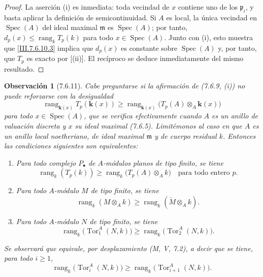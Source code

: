 \documentclass[10pt,oneside,openany]{book}
\theoremstyle{egaenv}\newtheorem*{env}{---}
\theoremstyle{egastatement}
\theoremstyle{egadescription}
\newtheorem*{remark}{Observación}
\renewcommand{\leq}{\leqslant}
\renewcommand{\geq}{\geqslant}
\begin{document}
\begin{proof}
La aserción \textnormal{(i)} es inmediata: toda vecindad de $x$
contiene uno de los $\mathfrak p_i$, y basta aplicar la definición de
semicontinuidad. Si $A$ es local, la única vecindad en $\operatorname{Spec}(A)$ del ideal
maximal $\mathfrak m$ es $\operatorname{Spec}(A)$; por tanto,
$d_p(x)\leq\operatorname{rang}_k T_p(k)$
para todo $x\in\operatorname{Spec}(A)$. Junto con \textnormal{(i)}, esto muestra que
\eqref{III.7.6.10.3} implica que $d_p(x)$ es constante sobre
$\operatorname{Spec}(A)$ y, por tanto, que $T_p$ es exacto por
[(ii)]. El recíproco se deduce inmediatamente del
mismo resultado.
\end{proof}

\begin{remark}[7.6.11]
Cabe preguntarse si la afirmación de (7.6.9, (i)) no puede reforzarse con
la desigualdad
\[
  \operatorname{rang}_{\mathbf{k}(x)}T_p(\boldsymbol{k}(x))
  \geq
  \operatorname{rang}_{\mathbf{k}(x)}
    \bigl(T_p(A)\otimes_A\boldsymbol{k}(x)\bigr)
  \tag{7.6.11.1}\label{III.7.6.11.1.fr}
\]
para todo $x\in\operatorname{Spec}(A)$, que se verifica efectivamente cuando $A$
es un anillo de valuación discreta y $x$ su ideal maximal (7.6.5).
Limitémonos al caso en que $A$ es un anillo \emph{local} noetheriano, de ideal maximal
$\mathfrak m$ y de cuerpo residual $k$. Entonces las condiciones siguientes son
\emph{equivalentes}:
\begin{enumerate}
  \item[\emph{a)}] Para \emph{todo} complejo $P_\bullet$ de $A$-módulos planos de tipo finito,
    se tiene
    \[
      \operatorname{rang}_k(T_p(k))
      \geq
      \operatorname{rang}_k\bigl(T_p(A)\otimes_A k\bigr)
      \quad\text{para todo entero }p.
      \tag{7.6.11.2}\label{III.7.6.11.2.fr}
    \]
  \item[\emph{b)}] Para todo $A$-módulo $M$ de tipo finito, se tiene
    \[
      \operatorname{rang}_k(M\otimes_A k)
      \geq
      \operatorname{rang}_k(\check M\otimes_A k).
      \tag{7.6.11.3}\label{III.7.6.11.3.fr}
    \]
  \item[\emph{c)}] Para todo $A$-módulo $N$ de tipo finito, se tiene
    \[
      \operatorname{rang}_k\bigl(\operatorname{Tor}_1^A(N,k)\bigr)
      \geq
      \operatorname{rang}_k\bigl(\operatorname{Tor}_2^A(N,k)\bigr).
      \tag{7.6.11.4}\label{III.7.6.11.4.fr}
    \]
\end{enumerate}

Se observará que equivale, por desplazamiento (M, V, 7.2), a decir que se tiene,
para todo $i\geq1$,
\[
  \operatorname{rang}_k\bigl(\operatorname{Tor}_i^A(N,k)\bigr)
  \geq
  \operatorname{rang}_k\bigl(\operatorname{Tor}_{i+1}^A(N,k)\bigr).
  \tag{7.6.11.5}\label{III.7.6.11.5.fr}
\]


\end{remark}
\end{document}
